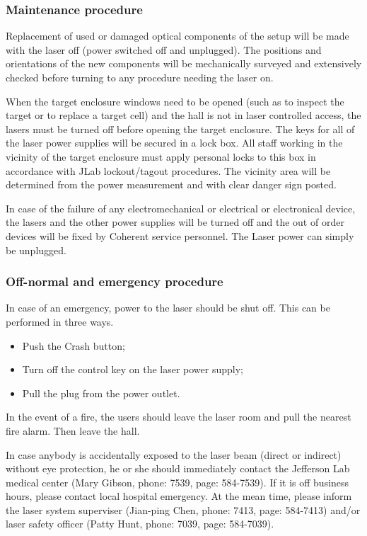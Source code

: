 {\subsubsection{Maintenance procedure}

Replacement of used or damaged optical components of the setup will be made with the
laser off (power switched off and unplugged).  The positions and 
orientations of the new components will be mechanically
surveyed and extensively checked before turning to any procedure needing the laser on.

When the target enclosure windows need to be opened (such as to inspect
the target or to replace a 
target cell) and the hall is not in laser controlled access, 
the lasers must be turned off before opening the target enclosure.
The keys for all of the laser power
supplies will be secured in a lock box.  All staff working in the
vicinity of the target enclosure 
must apply personal locks to this box in accordance with
JLab lockout/tagout procedures.
The vicinity area will be determined
from the power measurement and with clear danger sign posted.

In case of the failure of any electromechanical or electrical or electronical device,
the lasers and the other power supplies will be turned off and the out of order devices
will be fixed by Coherent service personnel. The Laser power
can simply be unplugged.


\subsubsection{Off-normal and emergency procedure}

In case of an emergency, power to the laser should be shut off.
This can be performed in three ways.
\begin {itemize}
\item Push the Crash button;
\item Turn off the control key on the laser power supply;
\item Pull the plug from the power outlet.
\end {itemize}

In the event of a fire, the users should leave the laser room and pull the 
nearest fire alarm. Then leave the hall.

In case anybody is accidentally exposed to the laser beam (direct or indirect)
without eye protection, he or she should immediately contact the Jefferson
Lab medical center (Mary Gibson, phone: 7539, page: 584-7539). If it is 
off business hours, please contact local hospital emergency. At the mean time,
please inform the laser system superviser (Jian-ping Chen, phone: 7413,
page: 584-7413) and/or laser safety officer (Patty Hunt, phone: 7039,
page: 584-7039). 


}
